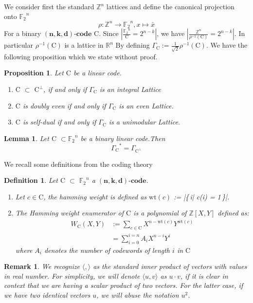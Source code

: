 \documentclass{article}
\newtheorem{lemma}[theorem]{Lemma}
\newtheorem{definition}[theorem]{Definition}
\newtheorem{prop}[theorem]{Proposition}
\newtheorem{remark}[theorem]{Remark}
\numberwithin{equation}{theorem}
\numberwithin{figure}{theorem}
\newcommand{\Ftwo}{\ensuremath{\mathbb{F}_2}}
\newcommand{\simpleCodes}{\ensuremath{\mathrm{C}}}
\newcommand{\buildVertical}[1]{\ensuremath{#1^{\bot}}}
\newcommand{\buildLattice}[1]{\ensuremath{\Gamma_{#1}}}
\newcommand{\weightEnumerator}[3]{\ensuremath{W_{#1}(#2,#3)}}
\newcommand{\linearCode}[3]{\ensuremath{\bm{(#1,#2,#3)\mbox{-}code}}}
\newcommand{\wt}[1]{\ensuremath{\text{wt}(#1)}}
\newcommand{\Integer}{\ensuremath{\mathbb{Z}}}
\newcommand{\Real}{\ensuremath{\mathbb{R}}}
\begin{document}
We consider first the standard $\Integer^{n}$ lattices and define the canonical projection onto $\Ftwo^{n}$
\[
	\rho: \Integer^n \rightarrow \Ftwo^{n}, x \mapsto \bar{x}
\]
For a binary {\linearCode{n}{k}{d}} {\simpleCodes}. Since $|\frac{\Ftwo^n}{\simpleCodes} = 2^{n-k}|$, we have $|\frac{\Integer^{n}}{\rho^{-1}(\simpleCodes)} = 2^{n-k}|$. In particular $\rho^{-1}(\simpleCodes)$ is a lattice in $\Real^n$
By defining $\Gamma_{\simpleCodes} := \frac{1}{\sqrt{2}}\rho^{-1}(\simpleCodes)$. We have the following proposition which we state without proof.
\begin{prop}\label{codeLatticeProp} Let {\simpleCodes} be a linear code.
	\begin{enumerate}
		\item {\simpleCodes} $\subset$ {\buildVertical{\simpleCodes}}, if and only if {\buildLattice{\simpleCodes}} is an integral Lattice
		\item {\simpleCodes} is doubly even if and only if {\buildLattice{\simpleCodes}} is an even Lattice.
		\item {\simpleCodes} is self-dual if and only if {\buildLattice{\simpleCodes}} is a unimodular Lattice.
	\end{enumerate}
\end{prop}
\begin{lemma}\label{latticeDualcodeVertLemma}
Let {\simpleCodes} $\subset \Ftwo^n$ be a binary linear code.Then
\[
	\buildLattice{\simpleCodes}^* = \buildLattice{\buildVertical{\simpleCodes}}
\]
\end{lemma}
We recall some definitions from the coding theory
\begin{definition} Let {\simpleCodes} $\subset$ $\Ftwo^{n}$ a \linearCode{n}{k}{d}. 
	\begin{enumerate}
		\item Let $c \in \simpleCodes$, the hamming weight is defined as \wt{c} := |\{\,i| c(i) = 1\,\}|.
		\item The \emph{Hamming weight enumerator} of {\simpleCodes} is a polynomial of $\Integer[X,Y]$ defined as:
		\begin{align*}
			\weightEnumerator{\simpleCodes}{X}{Y} &:= \sum_{c \in \simpleCodes}X^{n - \wt{c}}Y^{\wt{c}}\\
			&= \sum_{i = 0}^{i = n}A_i X^{n - i}Y^i
		\end{align*}
		where $A_i$ denotes the number of codewords of length $i$ in {\simpleCodes}
	\end{enumerate}
\end{definition}
\begin{remark}
We recognize $\langle , \rangle$ as the standard inner product of vectors with values in real number. For simplicity, we will denote $\langle u,v \rangle$ as $u \cdot v$, if it is clear in context that we are having a scalar product of two vectors. For the latter case, if we have two identical vectors $u$, we will abuse the notation $u^2$.
\end{remark}
\end{document}
